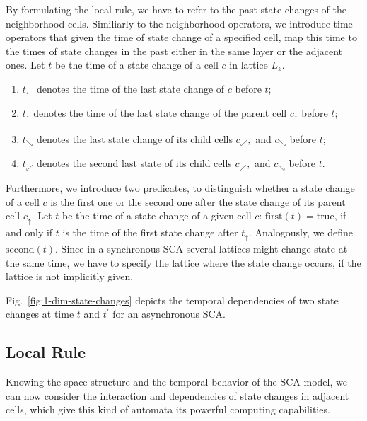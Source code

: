 \documentclass[pre,amssymb,showpacs,showkeys,preprint]{revtex4}
\begin{document}
By formulating the local rule, we have to refer to the past state changes of the neighborhood cells.
Similiarly to the neighborhood operators, we introduce time operators that given the time of
state change of a specified cell, map this time to the times of state changes in the past either
in the same layer or the adjacent ones.
Let $t$ be the time of a state change of a cell $c$ in lattice $L_k$.
\begin{enumerate}
\item $t_\leftarrow$ denotes the time of the last state change of $c$ before $t$;
\item $t_\uparrow$ denotes the time of the last state change of the parent cell $c_\uparrow$ before
 $t$;
\item $t_\searrow$ denotes the last state change of its child cells $c_\swarrow,$ and $c_\searrow$
before $t$;
\item $t_\swarrow$ denotes the second last state of its child cells $c_\swarrow,$ and $c_\searrow$
before $t$.
\end{enumerate}

Furthermore, we introduce two predicates, to distinguish whether a state change of a cell $c$ is the
first one or the second one after the state change of its parent cell $c_\uparrow$.
Let $t$ be the time of a state change of a given cell $c$:
$\mbox{first}(t) = \mbox{true}$, if and only if $t$ is the time of the first state change after
$t_\uparrow$.
Analogously, we define $\mbox{second}(t)$.
Since in a synchronous SCA several lattices might change state at the same time, we have to
specify the lattice where the state change occurs, if the lattice is not implicitly given.

Fig.~\ref{fig:1-dim-state-changes} depicts the temporal dependencies of two state changes at time
$t$ and $t^\prime$ for an
asynchronous SCA.

\subsection{Local Rule}

Knowing the space structure and the temporal behavior of the SCA model,
we can now consider the interaction and dependencies of state changes in adjacent cells,
which give this kind of automata its powerful computing capabilities.
\end{document}
